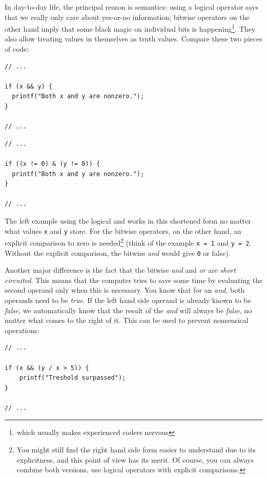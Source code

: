 In day-to-day life, the principal reason is semantics: using a logical operator says that we really only care about yes-or-no information; bitwise operators on the other hand imply that some black magic on individual bits is happening\footnote{which usually makes experienced coders nervous}. They also allow treating values in themselves as truth values. Compare these two pieces of code:
{
\begin{tcbraster}[raster columns=2,
                  raster equal height,
                  nobeforeafter,
                  raster column skip=0.2cm]
\begin{codebox}[nonzeroLogicalAnd.c]
\begin{verbatim}
// ...

if (x && y) {
  printf("Both x and y are nonzero.");
}

// ...
\end{verbatim}
\end{codebox}
%
\begin{codebox}[nonzeroBitwiseAnd.c]
\begin{verbatim}
// ...

if ((x != 0) & (y != 0)) {
  printf("Both x and y are nonzero.");
}

// ...
\end{verbatim}
\end{codebox}
\end{tcbraster}
}

The left example using the logical and works in this shortened form no matter what values \texttt{x} and \texttt{y} store. For the bitwise operators, on the other hand, an explicit comparison to zero is needed\footnote{You might still find the right hand side form easier to understand due to its explicitness, and this point of view has its merit. Of course, you can always combine both versions, \ie use logical operators with explicit comparisons.} (think of the example \texttt{x = 1} and \texttt{y = 2}. Without the explicit comparison, the bitwise \emph{and} would give \texttt{0} or false).

Another major difference is the fact that the bitwise \emph{and} and \emph{or} are \emph{short circuited}. This means that the computer tries to save some time by evaluating the second operand only when this is necessary. You know that for an \emph{and}, both operands need to be \emph{true}. If the left hand side operand is already known to be \emph{false}, we automatically know that the result of the \emph{and} will always be \emph{false}, no matter what comes to the right of it. This can be used to prevent nonsensical operations:
\begin{codebox}
\begin{verbatim}
// ...

if (x && (y / x > 5)) {
    printf("Treshold surpassed");
}

// ...
\end{verbatim}
\end{codebox}

